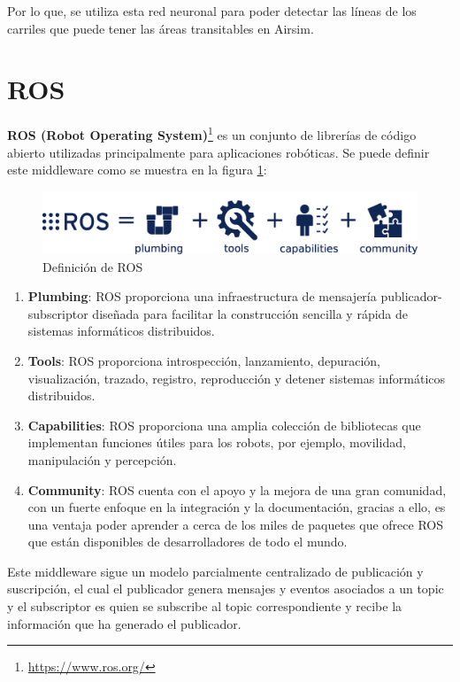 Por lo que, se utiliza esta red neuronal para poder detectar las líneas de los carriles que puede tener las áreas transitables en Airsim. 

\section{ROS}
\label{sec:ros}
\textbf{ROS (Robot Operating System)}\footnote{\url{https://www.ros.org/}} es un conjunto de librerías de código abierto utilizadas principalmente para aplicaciones robóticas. 
Se puede definir este middleware como se muestra en la figura \ref{fig:ROS}:

\begin{figure} [H]
    \begin{center}
      \includegraphics[scale=0.18]{figs/Plataformas_Desarollo/ros-equation.png}
    \end{center}
    \caption{Definición de ROS}
    \label{fig:ROS}
    \vspace{-1.5em}
  \end{figure}


\begin{enumerate}
    \item \textbf{Plumbing}: ROS proporciona una infraestructura de mensajería publicador-subscriptor diseñada para facilitar la construcción sencilla y rápida de sistemas informáticos
    distribuidos.
    \item \textbf{Tools}: ROS proporciona introspección, lanzamiento, depuración, visualización, trazado, registro, reproducción y detener sistemas informáticos distribuidos.
    \item \textbf{Capabilities}: ROS proporciona una amplia colección de bibliotecas que implementan funciones útiles para los robots, por ejemplo, movilidad, manipulación y percepción.
    \item \textbf{Community}: ROS cuenta con el apoyo y la mejora de una gran comunidad, con un fuerte enfoque en la integración y la documentación, gracias a ello, es una ventaja poder
    aprender a cerca de los miles de paquetes que ofrece ROS que están disponibles de desarrolladores de todo el mundo.
\end{enumerate}

Este middleware sigue un modelo parcialmente centralizado de publicación y suscripción, el cual el publicador genera mensajes y eventos asociados a un topic y el subscriptor
es quien se subscribe al topic correspondiente y recibe la información que ha generado el publicador. 

